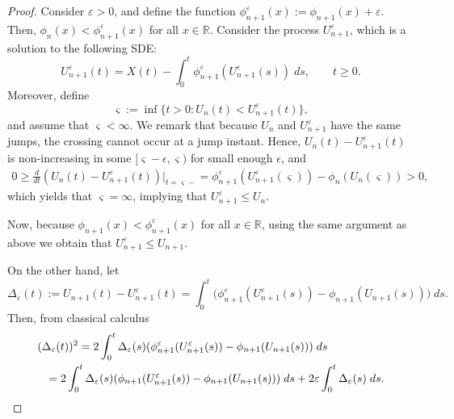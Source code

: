 \documentclass[12pt,reqno]{amsart}
\newcommand{\red}{\textcolor[rgb]{1.00,0.00,0.00}}
\newcommand{\blue}{\textcolor[rgb]{0.00,0.00,1.00}}
\theoremstyle{definition}
\theoremstyle{remark}
\begin{document}
\begin{proof}
Consider $\varepsilon>0$, and define the function $\phi_{n+1}^{\varepsilon}(x):=\phi_{n+1}(x)+\varepsilon$. Then, $\phi_n(x)<\phi_{n+1}^{\varepsilon}(x)$ 
	for all $x\in\mathbb{R}$. Consider the process $U^{\varepsilon}_{n+1}$, which is a solution to the following SDE:
		\[
		U^{\varepsilon}_{n+1}(t)=X(t)-\int_0^t\phi_{n+1}^{\varepsilon}(U^{\varepsilon}_{n+1}(s))\;ds,\qquad\text{$t\geq0$.}
		\]
				Moreover, define
		\[
		\varsigma{:=}\inf\{t>0:U_n(t)<U^{\varepsilon}_{n+1}(t)\},
		\]
		and assume that $\varsigma<\infty$. We remark that because $U_n$ and $U^{\varepsilon}_{n+1}$ have the same jumps, the crossing cannot occur 
		at a jump instant. Hence, $U_n(t)-U^{\varepsilon}_{n+1}(t)$ is non-increasing in some $[\varsigma-\epsilon, \varsigma)$  for small enough $\epsilon$, and
		\begin{align}\label{d1}
		0\geq\frac{d}{dt}\left(U_n(t)-U^{\varepsilon}_{n+1}(t)\right)\Bigg|_{t=\varsigma-}=\phi_{n+1}^\varepsilon(U^{\varepsilon}_{n+1}(\varsigma))-\phi_n(U_n(\varsigma)) >0,
		\end{align}
		which yields that 
		$\varsigma=\infty$, implying that $U^{\varepsilon}_{n+1}\leq U_n$. 
		
		Now, because $\phi_{n+1}(x)<\phi_{n+1}^{\varepsilon}(x)$ 
	for all $x\in\mathbb{R}$, using the same argument as above we obtain that $U^{\varepsilon}_{n+1}\leq U_{n+1}$.
		
\smallskip		
On the other hand, let
$$\Delta_{\varepsilon}(t):=U_{n+1}(t)-U^{\varepsilon}_{n+1}(t)=\int_0^t \Big( \phi_{n+1}^{\varepsilon}(U^{\varepsilon}_{n+1}(s))-\phi_{n+1}(U_{n+1}(s)) \Big) \;ds.$$
Then, from classical calculus 
\begin{eqnarray*}
\lefteqn{(\Delta_{\varepsilon}(t))^2=2\int_0^t  \Delta_{\varepsilon}(s)( \phi_{n+1}^{\varepsilon}(U^{\varepsilon}_{n+1}(s))-\phi_{n+1}(U_{n+1}(s)))\;ds}\\
&&= 2\int_0^t \Delta_{\varepsilon}(s)( \phi_{n+1}(U^{\varepsilon}_{n+1}(s))-\phi_{n+1}(U_{n+1}(s)))\;ds+ 2\varepsilon \int_0^t \Delta_{\varepsilon}(s) \;ds .
\end{eqnarray*}


\end{proof}
\end{document}
